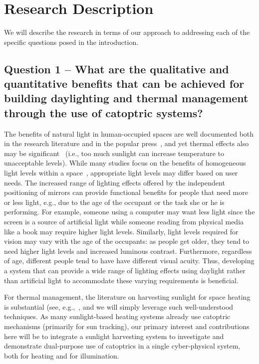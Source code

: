 \section{Research Description}
\label{sec:research}

We will describe the research in terms of our approach to addressing each
of the specific questions posed in the introduction.

\subsection{Question 1 -- What are the qualitative and quantitative benefits
that can be achieved for building daylighting and thermal management
through the use of catoptric systems?}

The benefits of natural light in human-occupied spaces are well
documented both in the research literature and in the popular
press~\cite{hhm15,Leslie03,ll01,Libby03,pce00,vandenW14},
and yet thermal effects also may be significant~\cite{bmbc13} (i.e., too much sunlight can increase temperature to unacceptable levels).
While many studies focus on the benefits of homogeneous light levels within a space~\cite{azaise13,bwkk15,gb16}, appropriate light levels may differ based on user needs.
The increased range of lighting effects offered by the independent positioning of mirrors
can provide functional benefits for people that need more or less
light, e.g., due to the age of the occupant or the task she or he is performing. For 
example, someone using a computer may want less light since the screen is a source of
artificial light while someone reading from physical media like
a book may require higher light levels. Similarly, light levels required for
vision may vary with the age of the occupants: as people get older, they tend to need 
higher light levels and increased luminous contrast. Furthermore, regardless of age,
different people tend to have have different visual acuity. Thus, developing a system 
that can provide a wide range of lighting effects using daylight rather than artificial light to accommodate these varying requirements is beneficial.

For thermal management, the literature on harvesting sunlight for
space heating is substantial (see,
e.g.,~\cite{deW75,Hunt79,kbd76,Lunde80,smf08,wo06}, and we will simply
leverage such well-understood techniques. As many sunlight-based
heating systems already use catoptric mechanisms (primarily for sun
tracking), our primary interest and contributions here will be to
integrate a sunlight harvesting system to investigate and demonstrate
dual-purpose use of catoptrics in a single cyber-physical system, both
for heating and for illumination.

